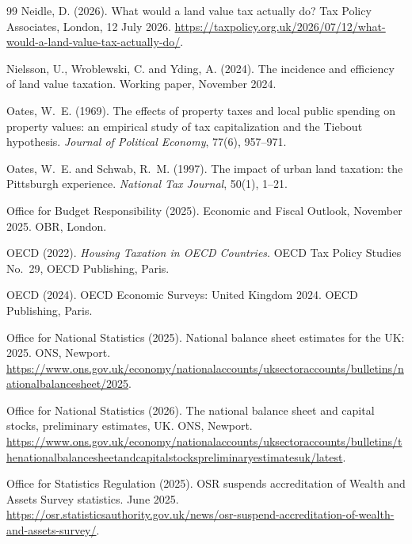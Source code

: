 \begin{thebibliography}{99}
Neidle, D. (2026).
\newblock What would a land value tax actually do?
\newblock Tax Policy Associates, London, 12 July 2026. \url{https://taxpolicy.org.uk/2026/07/12/what-would-a-land-value-tax-actually-do/}.

Nielsson, U., Wroblewski, C. and Yding, A. (2024).
\newblock The incidence and efficiency of land value taxation.
\newblock Working paper, November 2024.

Oates, W.~E. (1969).
\newblock The effects of property taxes and local public spending on property values: an empirical study of tax capitalization and the Tiebout hypothesis.
\newblock \emph{Journal of Political Economy}, 77(6), 957--971.

Oates, W.~E. and Schwab, R.~M. (1997).
\newblock The impact of urban land taxation: the Pittsburgh experience.
\newblock \emph{National Tax Journal}, 50(1), 1--21.

Office for Budget Responsibility (2025).
\newblock Economic and Fiscal Outlook, November 2025.
\newblock OBR, London.

OECD (2022).
\newblock \emph{Housing Taxation in OECD Countries}.
\newblock OECD Tax Policy Studies No.~29, OECD Publishing, Paris.

OECD (2024).
\newblock OECD Economic Surveys: United Kingdom 2024.
\newblock OECD Publishing, Paris.

Office for National Statistics (2025).
\newblock National balance sheet estimates for the UK: 2025.
\newblock ONS, Newport. \url{https://www.ons.gov.uk/economy/nationalaccounts/uksectoraccounts/bulletins/nationalbalancesheet/2025}.

Office for National Statistics (2026).
\newblock The national balance sheet and capital stocks, preliminary estimates, UK.
\newblock ONS, Newport. \url{https://www.ons.gov.uk/economy/nationalaccounts/uksectoraccounts/bulletins/thenationalbalancesheetandcapitalstockspreliminaryestimatesuk/latest}.

Office for Statistics Regulation (2025).
\newblock OSR suspends accreditation of Wealth and Assets Survey statistics.
\newblock June 2025. \url{https://osr.statisticsauthority.gov.uk/news/osr-suspend-accreditation-of-wealth-and-assets-survey/}.


\end{thebibliography}
